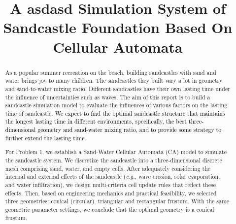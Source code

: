 \documentclass{mcmthesis}		    %
\title{\textbf{A asdasd Simulation System of Sandcastle Foundation Based On Cellular Automata}}			%
\def\eg{\mbox{\textit{e.g.}}}
\def\lyx{\textcolor{black}}
\def\gjx{\textcolor{black}}
\begin{document}
	\setlength{\parskip}{0.5\baselineskip}
	\begin{abstract}
		\hspace{1em} 
    As a popular summer recreation on the beach, building sandcastles with sand and water brings joy to many children. The sandcastles they built vary a lot in geometry and sand-to-water mixing ratio. Different sandcastles have their own lasting time under the influence of uncertainties such as waves. The aim of this report is to build a sandcastle simulation model to evaluate the influences of various factors on the lasting time of sandcastle. %
    \gjx{We expect to find the optimal sandcastle structure that maintains the longest lasting time in different environments, specifically, the best three-dimensional geometry and sand-water mixing ratio, and to provide some strategy to further extend the lasting time.}

For Problem 1, we establish a Sand-Water Cellular Automata (CA) model to 
simulate the sandcastle system. We discretize the sandcastle into a three-dimensional discrete mesh comprising sand, water, and empty cells. After adequately considering the internal and external effects of the sandcastle (\eg, wave erosion, solar evaporation, and water infiltration), we design multi-criteria cell update rules that reflect these effects. Then, based on engineering mechanics and practical feasibility, we selected three geometries: conical (circular), triangular and rectangular frustum. With the same geometric parameter settings, we conclude that the optimal geometry is a conical frustum.


\end{abstract}
\end{document}
